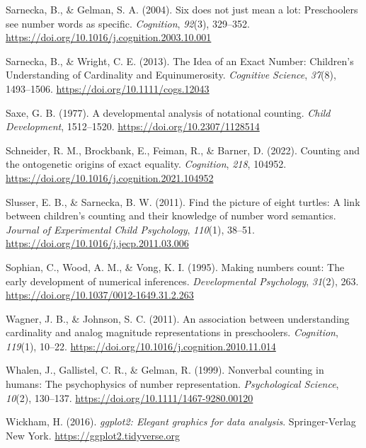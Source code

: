 \documentclass[
  man,floatsintext]{apa7}
\newlength{\cslhangindent}
\newlength{\cslentryspacingunit} %
\newenvironment{CSLReferences}[2] %
 {%
  \setlength{\parindent}{0pt}
  \ifodd #1
  \let\oldpar\par
  \def\par{\hangindent=\cslhangindent\oldpar}
  \fi
  \setlength{\parskip}{#2\cslentryspacingunit}
 }%
 {}
\begin{document}
\begin{CSLReferences}{1}{0}
\leavevmode{}%
Sarnecka, B., \& Gelman, S. A. (2004). Six does not just mean a lot: Preschoolers see number words as specific. \emph{Cognition}, \emph{92}(3), 329--352. \url{https://doi.org/10.1016/j.cognition.2003.10.001}

\leavevmode{}%
Sarnecka, B., \& Wright, C. E. (2013). The {Idea} of an {Exact} {Number}: {Children}'s {Understanding} of {Cardinality} and {Equinumerosity}. \emph{Cognitive Science}, \emph{37}(8), 1493--1506. \url{https://doi.org/10.1111/cogs.12043}

\leavevmode{}%
Saxe, G. B. (1977). A developmental analysis of notational counting. \emph{Child Development}, 1512--1520. \url{https://doi.org/10.2307/1128514}

\leavevmode{}%
Schneider, R. M., Brockbank, E., Feiman, R., \& Barner, D. (2022). Counting and the ontogenetic origins of exact equality. \emph{Cognition}, \emph{218}, 104952. \url{https://doi.org/10.1016/j.cognition.2021.104952}

\leavevmode{}%
Slusser, E. B., \& Sarnecka, B. W. (2011). Find the picture of eight turtles: A link between children's counting and their knowledge of number word semantics. \emph{Journal of Experimental Child Psychology}, \emph{110}(1), 38--51. \url{https://doi.org/10.1016/j.jecp.2011.03.006}

\leavevmode{}%
Sophian, C., Wood, A. M., \& Vong, K. I. (1995). Making numbers count: The early development of numerical inferences. \emph{Developmental Psychology}, \emph{31}(2), 263. \url{https://doi.org/10.1037/0012-1649.31.2.263}

\leavevmode{}%
Wagner, J. B., \& Johnson, S. C. (2011). An association between understanding cardinality and analog magnitude representations in preschoolers. \emph{Cognition}, \emph{119}(1), 10--22. \url{https://doi.org/10.1016/j.cognition.2010.11.014}

\leavevmode{}%
Whalen, J., Gallistel, C. R., \& Gelman, R. (1999). Nonverbal counting in humans: The psychophysics of number representation. \emph{Psychological Science}, \emph{10}(2), 130--137. \url{https://doi.org/10.1111/1467-9280.00120}

\leavevmode{}%
Wickham, H. (2016). \emph{ggplot2: Elegant graphics for data analysis}. Springer-Verlag New York. \url{https://ggplot2.tidyverse.org}


\end{CSLReferences}
\end{document}
